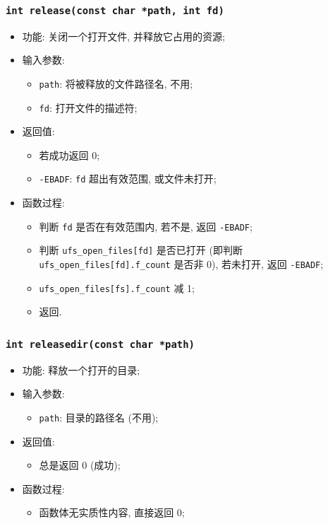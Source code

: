 \documentclass[nofonts]{ctexart}
\begin{document}
  \subsubsection{\texttt{int release(const char *path, int fd)}}
  \begin{itemize}
\item
  功能: 关闭一个打开文件, 并释放它占用的资源;
\item
  输入参数:

  \begin{itemize}
  \item
    \texttt{path}: 将被释放的文件路径名, 不用;
  \item
    \texttt{fd}: 打开文件的描述符;
  \end{itemize}
\item
  返回值:

  \begin{itemize}
  \item
    若成功返回 0;
  \item
    \texttt{-EBADF}: \texttt{fd} 超出有效范围, 或文件未打开;
  \end{itemize}
\item
  函数过程:

  \begin{itemize}
  \item
    判断 \texttt{fd} 是否在有效范围内, 若不是, 返回 \texttt{-EBADF};
  \item
    判断 \texttt{ufs\_open\_files{[}fd{]}} 是否已打开 (即判断
    \texttt{ufs\_open\_files{[}fd{]}.f\_count} 是否非 0), 若未打开, 返回
    \texttt{-EBADF};
  \item
    \texttt{ufs\_open\_files{[}fs{]}.f\_count} 减 1;
  \item
    返回.
  \end{itemize}
  \end{itemize}
  \subsubsection{\texttt{int releasedir(const char *path)}}
  \begin{itemize}
\item
  功能: 释放一个打开的目录;
\item
  输入参数:

  \begin{itemize}
  \item
    \texttt{path}: 目录的路径名 (不用);
  \end{itemize}
\item
  返回值:

  \begin{itemize}
  \item
    总是返回 0 (成功);
  \end{itemize}
\item
  函数过程:

  \begin{itemize}
  \item
    函数体无实质性内容, 直接返回 0;
  \end{itemize}
  \end{itemize}
\end{document}
